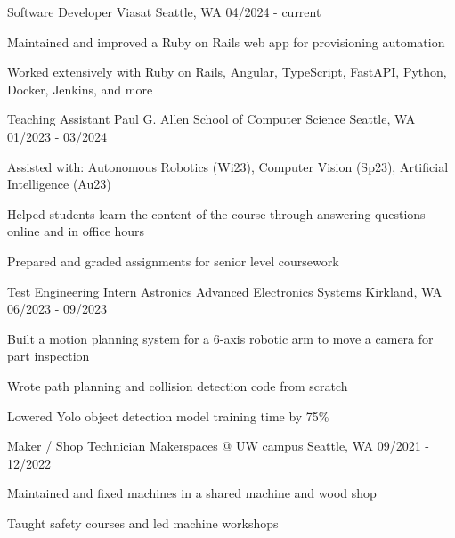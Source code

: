 
\begin{cventries}
  \cventry
    {Software Developer} %
    {Viasat} %
    {Seattle, WA} %
    {04/2024 - current} %
    {
      \begin{cvitems}
        \item {Maintained and improved a Ruby on Rails web app for provisioning automation}
        \item {Worked extensively with Ruby on Rails, Angular, TypeScript, FastAPI, Python, Docker, Jenkins, and more}
      \end{cvitems}
    }

  \cventry
    {Teaching Assistant} %
    {Paul G. Allen School of Computer Science} %
    {Seattle, WA} %
    {01/2023 - 03/2024} %
    {
      \begin{cvitems}
        \item {Assisted with: Autonomous Robotics (Wi23), Computer Vision (Sp23), Artificial Intelligence (Au23)}
        \item {Helped students learn the content of the course through answering questions online and in office hours}
        \item {Prepared and graded assignments for senior level coursework}
      \end{cvitems}
    }
    
  \cventry
    {Test Engineering Intern} %
    {Astronics Advanced Electronics Systems} %
    {Kirkland, WA} %
    {06/2023 - 09/2023} %
    {
      \begin{cvitems}
        \item {Built a motion planning system for a 6-axis robotic arm to move a camera for part inspection}
        \item {Wrote path planning and collision detection code from scratch}
        \item {Lowered Yolo object detection model training time by 75\%}
      \end{cvitems}
    }
    
  \cventry
    {Maker / Shop Technician} %
    {Makerspaces @ UW campus} %
    {Seattle, WA} %
    {09/2021 - 12/2022} %
    {
      \begin{cvitems}
        \item {Maintained and fixed machines in a shared machine and wood shop}
        \item {Taught safety courses and led machine workshops}
      \end{cvitems}
    }
    

\end{cventries}
